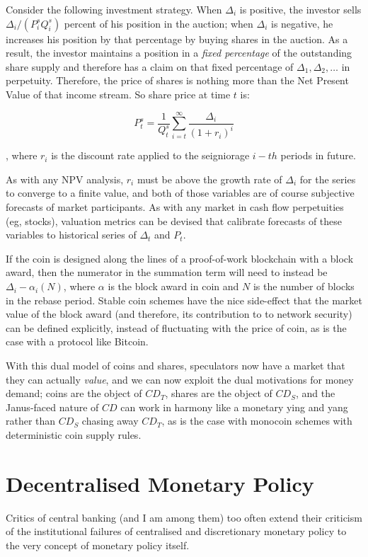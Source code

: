 \documentclass[twocolumn]{article}
\begin{document}
Consider the following investment strategy. When $\Delta_{i}$ is
positive, the investor sells $\Delta_{i}/(P^{s}_{i}Q^{s}_{i})$ percent
of his position in the auction; when $\Delta_{i}$ is negative, he
increases his position by that percentage by buying shares in the
auction. As a result, the investor maintains a position in a
\emph{fixed percentage} of the outstanding share supply and therefore
has a claim on that fixed percentage of $\Delta_{1}, \Delta_{2},\dots$
in perpetuity. Therefore, the price of shares is nothing more than the
Net Present Value of that income stream. So share price at time $t$
is:

\begin{equation}
\label{eqn:npv}
P^{s}_{t} = \frac{1}{Q^{s}_{t}}\sum\limits_{i=t}^{\infty}\frac{\Delta_{i}}{(1+r_{i})^{i}}
\end{equation}

, where $r_{i}$ is the discount rate applied to the seigniorage $i-th$
periods in future. 

As with any NPV analysis, $r_{i}$ must be above the growth rate of
$\Delta_{i}$ for the series to converge to a finite value, and both of
those variables are of course subjective forecasts of market
participants. As with any market in cash flow perpetuities (eg,
stocks), valuation metrics can be devised that calibrate forecasts of
these variables to historical series of $\Delta_{t}$ and $P_{t}$. 

If the coin is designed along the lines of a proof-of-work blockchain
with a block award, then the numerator in the summation term will
need to instead be $\Delta_{i} - \alpha_{i}(N)$, where $\alpha$ is the
block award in coin and $N$ is the number of blocks in the rebase
period. Stable coin schemes have the nice side-effect that the market
value of the block award (and therefore, its contribution to to
network security) can be defined explicitly, instead of fluctuating
with the price of coin, as is the case with a protocol like Bitcoin.

With this dual model of coins and shares, speculators now have a
market that they can actually \emph{value}, and we can now exploit the
dual motivations for money demand; coins are the object of $CD_{T}$,
shares are the object of $CD_{S}$, and the Janus-faced nature of $CD$
can work in harmony like a monetary ying and yang rather than $CD_{S}$
chasing away $CD_{T}$, as is the case with monocoin schemes with
deterministic coin supply rules.

\section*{Decentralised Monetary Policy}
Critics of central banking (and I am among them) too often extend
their criticism of the institutional failures of centralised and
discretionary monetary policy to the very concept of monetary policy
itself. 
\end{document}
